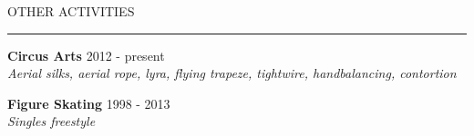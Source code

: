 \documentclass{resume} %
\renewenvironment{rSection}[1]{
\sectionskip
\textcolor{RoyalPurple}{\MakeUppercase{#1}}
\sectionlineskip
\hrule
\begin{list}{}{
\setlength{\leftmargin}{1.5em}
}
\item[]
}{
\end{list}
}
\begin{document}

%
%
%


\begin{rSection}{Other Activities}

{\bf Circus Arts} \hfill 2012 - present \\ 
{\em Aerial silks, aerial rope, lyra, flying trapeze, tightwire, handbalancing, contortion} 

{\bf Figure Skating} \hfill 1998 - 2013 \\ 
{\em Singles freestyle} 

\end{rSection}
\end{document}
